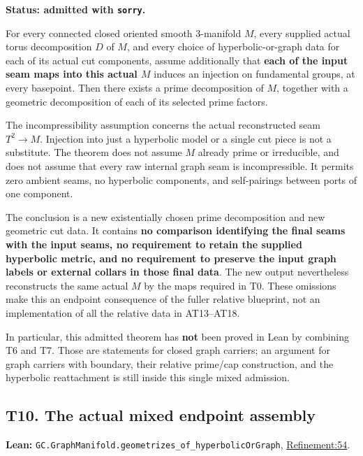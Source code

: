 \documentclass[
  letterpaper,
  11pt]{article}
\begin{document}
\textbf{Status: admitted with {\small\texttt{sorry}}.}

For every connected closed oriented smooth 3-manifold \(M\), every
supplied actual torus decomposition \(D\) of \(M\), and every choice of
hyperbolic-or-graph data for each of its actual cut components, assume
additionally that \textbf{each of the input seam maps into this actual
\(M\)} induces an injection on fundamental groups, at every basepoint.
Then there exists a prime decomposition of \(M\), together with a
geometric decomposition of each of its selected prime factors.

The incompressibility assumption concerns the actual reconstructed seam
\(T^2\to M\). Injection into just a hyperbolic model or a single cut
piece is not a substitute. The theorem does not assume \(M\) already
prime or irreducible, and does not assume that every raw internal graph
seam is incompressible. It permits zero ambient seams, no hyperbolic
components, and self-pairings between ports of one component.

The conclusion is a new existentially chosen prime decomposition and new
geometric cut data. It contains \textbf{no comparison identifying the
final seams with the input seams, no requirement to retain the supplied
hyperbolic metric, and no requirement to preserve the input graph labels
or external collars in those final data}. The new output nevertheless
reconstructs the same actual \(M\) by the maps required in T0. These
omissions make this an endpoint consequence of the fuller relative
blueprint, not an implementation of all the relative data in AT13--AT18.

In particular, this admitted theorem has \textbf{not} been proved in
Lean by combining T6 and T7. Those are statements for closed graph
carriers; an argument for graph carriers with boundary, their relative
prime/cap construction, and the hyperbolic reattachment is still inside
this single mixed admission.

\subsection{T10. The actual mixed endpoint assembly}\label{t10}

\textbf{Lean:}
{\small\texttt{GC.\allowbreak{}Graph\allowbreak{}Manifold.\allowbreak{}geometrizes\_\allowbreak{}of\_\allowbreak{}hyperbolic\allowbreak{}Or\allowbreak{}Graph}},
\href{https://github.com/qinz1yang/differential-geometry-dev/blob/ea0fae60ee01ef8c8d9b57a51794c6538f679c5d/DifferentialGeometry/Topology/ThreeManifold/GraphManifold/Refinement.lean\#L54}{Refinement:54}.
\end{document}
